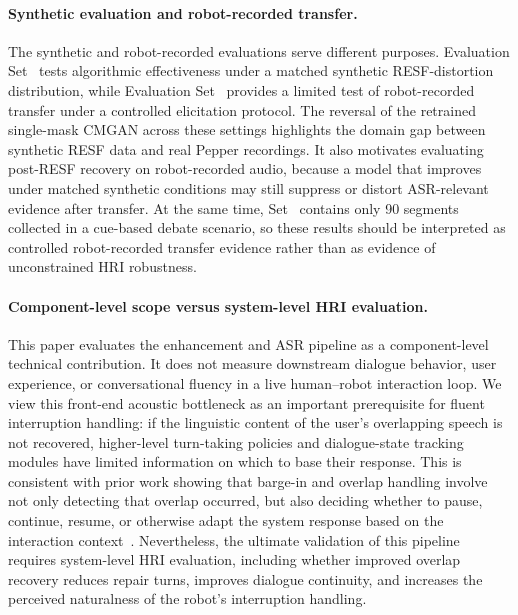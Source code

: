 \documentclass[manuscript,screen,review]{acmart}
\newcommand{\RomanNumeralCaps}[1]
    {\MakeUppercase{\romannumeral #1}}
\begin{document}
\paragraph{Synthetic evaluation and robot-recorded transfer.}
The synthetic and robot-recorded evaluations serve different purposes. Evaluation Set~\RomanNumeralCaps{1} tests algorithmic effectiveness under a matched synthetic RESF-distortion distribution, while Evaluation Set~\RomanNumeralCaps{3} provides a limited test of robot-recorded transfer under a controlled elicitation protocol. The reversal of the retrained single-mask CMGAN across these settings highlights the domain gap between synthetic RESF data and real Pepper recordings. It also motivates evaluating post-RESF recovery on robot-recorded audio, because a model that improves under matched synthetic conditions may still suppress or distort ASR-relevant evidence after transfer. At the same time, Set~\RomanNumeralCaps{3} contains only 90 segments collected in a cue-based debate scenario, so these results should be interpreted as controlled robot-recorded transfer evidence rather than as evidence of unconstrained HRI robustness.

\paragraph{Component-level scope versus system-level HRI evaluation.}
This paper evaluates the enhancement and ASR pipeline as a component-level technical contribution. It does not measure downstream dialogue behavior, user experience, or conversational fluency in a live human--robot interaction loop. We view this front-end acoustic bottleneck as an important prerequisite for fluent interruption handling: if the linguistic content of the user's overlapping speech is not recovered, higher-level turn-taking policies and dialogue-state tracking modules have limited information on which to base their response. This is consistent with prior work showing that barge-in and overlap handling involve not only detecting that overlap occurred, but also deciding whether to pause, continue, resume, or otherwise adapt the system response based on the interaction context~\cite{selfridge2013continuously,gervits2018pardon,skantze2021turn}. Nevertheless, the ultimate validation of this pipeline requires system-level HRI evaluation, including whether improved overlap recovery reduces repair turns, improves dialogue continuity, and increases the perceived naturalness of the robot's interruption handling.
\end{document}
